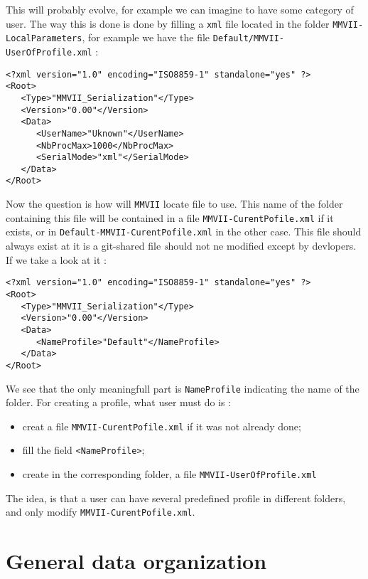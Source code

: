 This will probably evolve, for example we can imagine to have some category of user.
The way this is done is done by filling a {\tt xml} file located in the folder 
{\tt MMVII-LocalParameters}, for example we have the file {\tt Default/MMVII-UserOfProfile.xml} :

\begin{verbatim}
<?xml version="1.0" encoding="ISO8859-1" standalone="yes" ?>
<Root>
   <Type>"MMVII_Serialization"</Type>
   <Version>"0.00"</Version>
   <Data>
      <UserName>"Uknown"</UserName>
      <NbProcMax>1000</NbProcMax>
      <SerialMode>"xml"</SerialMode>
   </Data>
</Root>
\end{verbatim}

Now the question is how will {\tt MMVII} locate file to use. This name of the folder containing
this file will be contained in a file {\tt MMVII-CurentPofile.xml} if it exists,
or in {\tt Default-MMVII-CurentPofile.xml} in the other case. This file should always exist
at it is a git-shared file {\emph should not ne modified except by devlopers}.
If we take a look at  it : 

\begin{verbatim}
<?xml version="1.0" encoding="ISO8859-1" standalone="yes" ?>
<Root>
   <Type>"MMVII_Serialization"</Type>
   <Version>"0.00"</Version>
   <Data>
      <NameProfile>"Default"</NameProfile>
   </Data>
</Root>
\end{verbatim}

We see that the only meaningfull part is {\tt NameProfile} indicating the name
of the folder. For creating a profile, what user must do is :

\begin{itemize}
    \item creat a file  {\tt MMVII-CurentPofile.xml} if it was not already done;
    \item fill the field {\tt <NameProfile>};
    \item create in the corresponding folder, a file {\tt MMVII-UserOfProfile.xml}
\end{itemize}

The idea, is that a user can have several predefined profile in different folders,
and only modify  {\tt MMVII-CurentPofile.xml}.



\section{General data organization}




